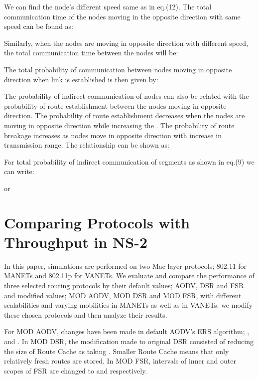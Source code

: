 \documentclass[journal]{IEEEtran}
\begin{document}
We can find the node's different speed same as in eq.(12). The total communication time of the nodes moving in the opposite direction with same speed can be found as:



Similarly, when the nodes are moving in opposite direction with different speed, the total communication time between the nodes will be:

\tiny

\normalsize

The total probability of communication between nodes moving in opposite direction when link is established is then given by:


The probability of indirect communication of nodes can also be related with the probability of route establishment between the nodes moving in opposite direction. The probability of route establishment decreases when the nodes are moving in opposite direction while increasing the . The probability of route breakage increases as nodes move in opposite direction with increase in transmission range.
The relationship can be shown as:




For total probability of indirect communication of  segments as shown in eq.(9) we can write:



or



\section{Comparing Protocols with Throughput in NS-2}
In this paper, simulations are performed on two Mac layer protocols; 802.11 for MANETs and 802.11p for VANETs. We evaluate and compare the performance of three selected routing protocols by their default values; AODV, DSR and FSR and modified values; MOD AODV, MOD DSR and MOD FSR, with different scalabilities and varying mobilities in MANETs as well as in VANETs. we modify these chosen protocols and then analyze their results.

For MOD AODV, changes have been made in default AODV's ERS algorithm; ,  and . In MOD DSR, the modification made to original DSR consisted of reducing the size of Route Cache as taking . Smaller Route Cache means that only relatively fresh routes are stored. In MOD FSR, intervals of inner and outer scopes of FSR are changed to  and  respectively.
\end{document}
